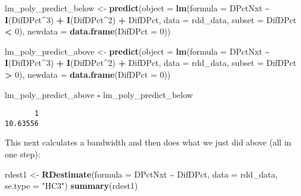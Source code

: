 \documentclass[
  12pt,
  leqno]{article}
\newenvironment{Shaded}{\begin{snugshade}}{\end{snugshade}}
\newcommand{\AttributeTok}[1]{\textcolor[rgb]{0.13,0.29,0.53}{#1}}
\newcommand{\DecValTok}[1]{\textcolor[rgb]{0.00,0.00,0.81}{#1}}
\newcommand{\FunctionTok}[1]{\textcolor[rgb]{0.13,0.29,0.53}{\textbf{#1}}}
\newcommand{\NormalTok}[1]{#1}
\newcommand{\OtherTok}[1]{\textcolor[rgb]{0.56,0.35,0.01}{#1}}
\newcommand{\SpecialCharTok}[1]{\textcolor[rgb]{0.81,0.36,0.00}{\textbf{#1}}}
\newcommand{\StringTok}[1]{\textcolor[rgb]{0.31,0.60,0.02}{#1}}
\begin{document}
\begin{Shaded}
\begin{Highlighting}[]
\NormalTok{lm\_poly\_predict\_below }\OtherTok{\textless{}{-}} \FunctionTok{predict}\NormalTok{(}\AttributeTok{object =} \FunctionTok{lm}\NormalTok{(}\AttributeTok{formula =}\NormalTok{ DPctNxt }\SpecialCharTok{\textasciitilde{}} \FunctionTok{I}\NormalTok{(DifDPct}\SpecialCharTok{\^{}}\DecValTok{3}\NormalTok{) }\SpecialCharTok{+} \FunctionTok{I}\NormalTok{(DifDPct}\SpecialCharTok{\^{}}\DecValTok{2}\NormalTok{) }\SpecialCharTok{+}
\NormalTok{    DifDPct, }\AttributeTok{data =}\NormalTok{ rdd\_data, }\AttributeTok{subset =}\NormalTok{ DifDPct }\SpecialCharTok{\textless{}} \DecValTok{0}\NormalTok{), }\AttributeTok{newdata =} \FunctionTok{data.frame}\NormalTok{(}\AttributeTok{DifDPct =} \DecValTok{0}\NormalTok{))}

\NormalTok{lm\_poly\_predict\_above }\OtherTok{\textless{}{-}} \FunctionTok{predict}\NormalTok{(}\AttributeTok{object =} \FunctionTok{lm}\NormalTok{(}\AttributeTok{formula =}\NormalTok{ DPctNxt }\SpecialCharTok{\textasciitilde{}} \FunctionTok{I}\NormalTok{(DifDPct}\SpecialCharTok{\^{}}\DecValTok{3}\NormalTok{) }\SpecialCharTok{+} \FunctionTok{I}\NormalTok{(DifDPct}\SpecialCharTok{\^{}}\DecValTok{2}\NormalTok{) }\SpecialCharTok{+}
\NormalTok{    DifDPct, }\AttributeTok{data =}\NormalTok{ rdd\_data, }\AttributeTok{subset =}\NormalTok{ DifDPct }\SpecialCharTok{\textgreater{}} \DecValTok{0}\NormalTok{), }\AttributeTok{newdata =} \FunctionTok{data.frame}\NormalTok{(}\AttributeTok{DifDPct =} \DecValTok{0}\NormalTok{))}

\NormalTok{lm\_poly\_predict\_above }\SpecialCharTok{{-}}\NormalTok{ lm\_poly\_predict\_below}
\end{Highlighting}
\end{Shaded}

\begin{verbatim}
       1 
10.63556 
\end{verbatim}

\normalsize

This next calculates a bandwidth and then does what we just did above
(all in one step):

\scriptsize

\begin{Shaded}
\begin{Highlighting}[]
\NormalTok{rdest1 }\OtherTok{\textless{}{-}} \FunctionTok{RDestimate}\NormalTok{(}\AttributeTok{formula =}\NormalTok{ DPctNxt }\SpecialCharTok{\textasciitilde{}}\NormalTok{ DifDPct, }\AttributeTok{data =}\NormalTok{ rdd\_data, }\AttributeTok{se.type =} \StringTok{"HC3"}\NormalTok{)}
\FunctionTok{summary}\NormalTok{(rdest1)}
\end{Highlighting}
\end{Shaded}
\end{document}
